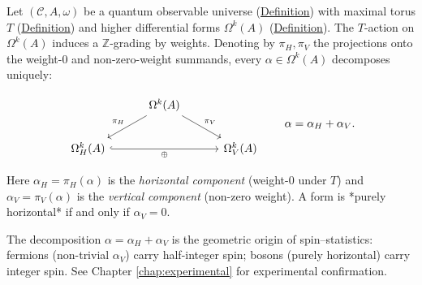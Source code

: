 \begin{definition}
  \label{def:weight-decomposition}
Let $(\mathcal{C}, A, \omega)$ be a quantum observable universe
(\hyperref[def:quantum-observable-universe]{Definition}) with maximal torus
$T$ (\hyperref[def:maximal-torus]{Definition}) and higher differential forms
$\Omega^k(A)$ (\hyperref[def:higher-forms]{Definition}). The $T$-action on
$\Omega^k(A)$ induces a $\mathbb{Z}$-grading by weights. Denoting by
$\pi_H, \pi_V$ the projections onto the weight-$0$ and non-zero-weight
summands, every $\alpha \in \Omega^k(A)$ decomposes uniquely:

\begin{equation}\label{eq:weight-decomposition-cd}
\begin{tikzcd}[row sep=2em, column sep=3em]
  & \Omega^k(A) \ar[dl, "\pi_H"'] \ar[dr, "\pi_V"] & \\
  \Omega^k_H(A) \ar[rr, hook, "\oplus"']
  & & \Omega^k_V(A)
\end{tikzcd}
\qquad \alpha = \alpha_H + \alpha_V.
\end{equation}

Here $\alpha_H = \pi_H(\alpha)$ is the \emph{horizontal component}
(weight-$0$ under $T$) and $\alpha_V = \pi_V(\alpha)$ is the
\emph{vertical component} (non-zero weight). A form is *purely
horizontal* if and only if $\alpha_V = 0$.
\end{definition}

\begin{remark}
  \label{rem:reeb-physical}
The decomposition $\alpha = \alpha_H + \alpha_V$ is the geometric origin of
spin--statistics: fermions (non-trivial $\alpha_V$) carry half-integer spin;
bosons (purely horizontal) carry integer spin. See
Chapter \ref{chap:experimental} for experimental confirmation.
\end{remark}

